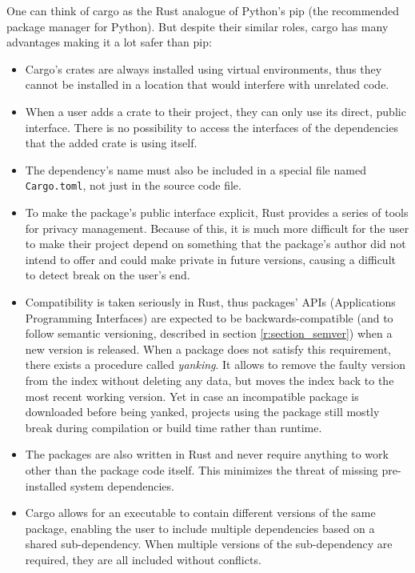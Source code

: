 \documentclass[licencjacka,en]{pracamgr}
\begin{document}
One can think of cargo as the Rust analogue of Python's pip (the recommended package manager for
Python). But despite their similar roles,
cargo has many advantages making it a lot safer than pip:
\begin{itemize}
	\item Cargo's crates are always installed using virtual environments, thus they cannot be
		installed in a location that would interfere with unrelated code.
	\item When a user adds a crate to their project, they can only use its direct, public interface.
		There is no possibility to access the interfaces of the dependencies that the added crate
		is using itself.
	\item The dependency's name must also be included in a special file named \texttt{Cargo.toml},
		not just in the source code file.
	\item To make the package's public interface explicit, Rust provides a series of tools for
		privacy management. Because of this, it is much more difficult for the user to make their
		project depend on something that the package's author did not intend to offer and could
		make private in future versions, causing a difficult to detect break on the user's end.
	\item Compatibility is taken seriously in Rust, thus packages' APIs (Applications Programming
		Interfaces) are expected to be backwards-compatible (and to follow semantic versioning,
		described in section \ref{r:section_semver}) when a new version is released. When a package
		does not satisfy this requirement, there exists a procedure called \textit{yanking}.
		It allows to remove the faulty version from the index without deleting any data, but moves
		the index back to the most recent working version. Yet in case an incompatible package is
		downloaded before being yanked, projects using the package still mostly break during
		compilation or build time rather than runtime.
	\item The packages are also written in Rust and never require anything to work other than the
		package code itself. This minimizes the threat of missing pre-installed
		system dependencies.
	\item Cargo allows for an executable to contain different versions of the same package,
		enabling the user to include multiple dependencies based on a shared sub-dependency.
		When multiple versions of the sub-dependency are required, they are all included
		without conflicts.
\end{itemize}
\end{document}
